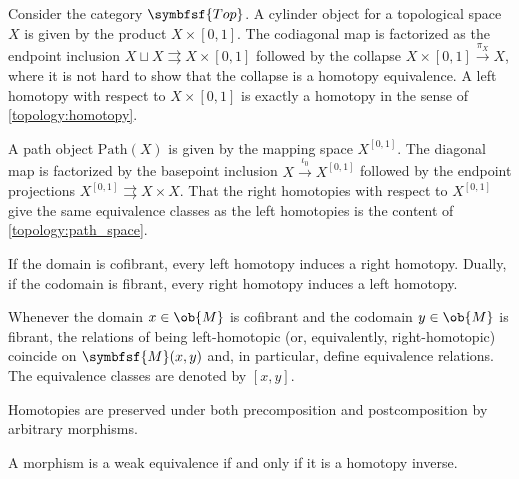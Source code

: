     \begin{example}
        Consider the category $\symbfsf{Top}$. A cylinder object for a topological space $X$ is given by the product $X\times[0,1]$. The codiagonal map is factorized as the endpoint inclusion $X\sqcup X\rightrightarrows X\times[0,1]$ followed by the collapse $X\times[0,1]\overset{\pi_X}{\rightarrow}X$, where it is not hard to show that the collapse is a homotopy equivalence. A left homotopy with respect to $X\times[0,1]$ is exactly a homotopy in the sense of \cref{topology:homotopy}.

        A path object $\mathrm{Path}(X)$ is given by the mapping space $X^{[0,1]}$. The diagonal map is factorized by the basepoint inclusion $X\overset{\iota_0}{\rightarrow}X^{[0,1]}$ followed by the endpoint projections $X^{[0,1]}\rightrightarrows X\times X$. That the right homotopies with respect to $X^{[0,1]}$ give the same equivalence classes as the left homotopies is the content of \cref{topology:path_space}.
    \end{example}

    \begin{property}
        If the domain is cofibrant, every left homotopy induces a right homotopy. Dually, if the codomain is fibrant, every right homotopy induces a left homotopy.
    \end{property}
    \begin{result}
        Whenever the domain $x\in\ob{M}$ is cofibrant and the codomain $y\in\ob{M}$ is fibrant, the relations of being left-homotopic (or, equivalently, right-homotopic) coincide on $\symbfsf{M}(x,y)$ and, in particular, define equivalence relations. The equivalence classes are denoted by $[x,y]$.
    \end{result}

    \begin{property}
        Homotopies are preserved under both precomposition and postcomposition by arbitrary morphisms.
    \end{property}
    \begin{property}\label{model:weak_equivalence_homotopy}
        A morphism is a weak equivalence if and only if it is a homotopy inverse.
    \end{property}


